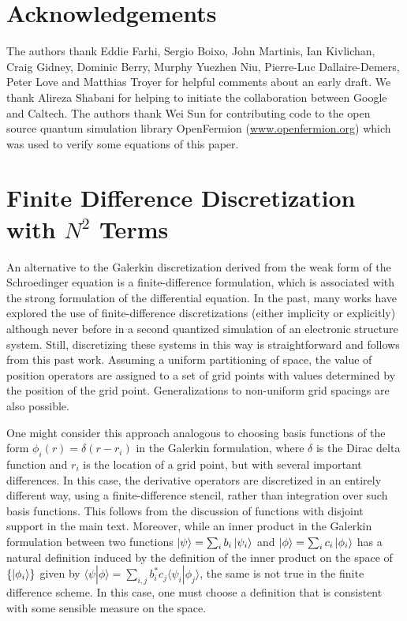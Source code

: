 \documentclass[superscriptaddress,aps,pra,nofootinbib,notitlepage,10pt,longbibliography]{revtex4-1}
\def\ket#1{\mathinner{|{#1}\rangle}}
\newcommand{\braket}[2]{\langle #1|#2\rangle}
\begin{document}
\section*{Acknowledgements}

The authors thank Eddie Farhi, Sergio Boixo, John Martinis, Ian Kivlichan, Craig Gidney, Dominic Berry, Murphy Yuezhen Niu, Pierre-Luc Dallaire-Demers, Peter Love and Matthias Troyer for helpful comments about an early draft. We thank Alireza Shabani for helping to initiate the collaboration between Google and Caltech. The authors thank Wei Sun for contributing code to the open source quantum simulation library OpenFermion (\url{www.openfermion.org}) \cite{openfermion} which was used to verify some equations of this paper.\\





\appendix


\section{Finite Difference Discretization with $N^2$ Terms}
\label{app:finite_diff}

An alternative to the Galerkin discretization derived from the weak form of the Schroedinger equation is a finite-difference formulation, which is associated with the strong formulation of the differential equation. In the past, many works have explored the use of finite-difference discretizations (either implicity or explicitly) \cite{Boghosian1998,Boghosian1998b,Meyer1996,Meyer1997,Wiesner1996} although never before in a second quantized simulation of an electronic structure system. Still, discretizing these systems in this way is straightforward and follows from this past work. Assuming a uniform partitioning of space, the value of position operators are assigned to a set of grid points with values determined by the position of the grid point. Generalizations to non-uniform grid spacings are also possible.

One might consider this approach analogous to choosing basis functions of the form $\phi_i(r) = \delta(r - r_i)$ in the Galerkin formulation, where $\delta$ is the Dirac delta function and $r_i$ is the location of a grid point, but with several important differences.  In this case, the derivative operators are discretized in an entirely different way, using a finite-difference stencil, rather than integration over such basis functions.  This follows from the discussion of functions with disjoint support in the main text. Moreover, while an inner product in the Galerkin formulation between two functions $\ket{\psi} = \sum_i b_i \ket{\psi_i}$ and $\ket{\phi} = \sum_i c_i \ket{\phi_i}$ has a natural definition induced by the definition of the inner product on the space of $\{\ket{\phi_i}\}$ given by $\braket{\psi}{\phi} = \sum_{i, j} b_i^* c_j \braket{\psi_i}{\phi_j}$, the same is not true in the finite difference scheme.  In this case, one must choose a definition that is consistent with some sensible measure on the space.  
\end{document}
